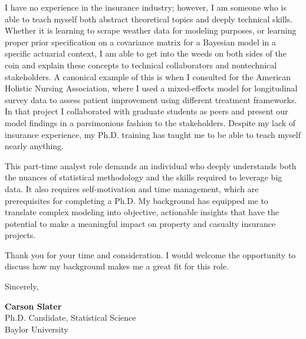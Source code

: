 \documentclass[11pt]{article}
\begin{document}
I have no experience in the insurance industry; however, I am someone who is able to teach myself both abstract theoretical topics and deeply technical skills. Whether it is learning to scrape weather data for modeling purposes, or learning proper prior specification on a covariance matrix for a Bayesian model in a specific actuarial context, I am able to get into the weeds on both sides of the coin and explain these concepts to technical collaborators and nontechnical stakeholders. A canonical example of this is when I consulted for the American Holistic Nursing Association, where I used a mixed-effects model for longitudinal survey data to assess patient improvement using different treatment frameworks. In that project I collaborated with graduate students as peers and present our model findings in a parsimonious fashion to the stakeholders. Despite my lack of insurance experience, my Ph.D. training has taught me to be able to teach myself nearly anything.

This part-time analyst role demands an individual who deeply understands both the nuances of statistical methodology and the skills required to leverage big data. It also requires self-motivation and time management, which are prerequisites for completing a Ph.D. My background has equipped me to translate complex modeling into objective, actionable insights that have the potential to make a meaningful impact on property and casualty insurance projects.

Thank you for your time and consideration. I would welcome the opportunity to discuss how my background makes me a great fit for this role.


\vspace{1em}
\noindent
Sincerely,

\vspace{1em}
\noindent
\textbf{Carson Slater} \\
Ph.D. Candidate, Statistical Science \\
Baylor University
\end{document}
